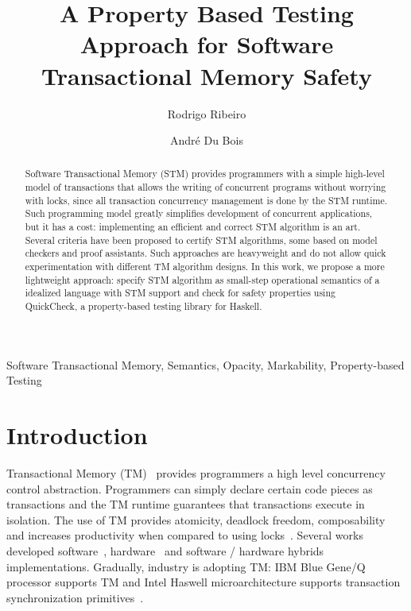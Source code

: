\documentclass[3p,times,procedia]{elsarticle}
\theoremstyle{definition}
\begin{document}
\begin{frontmatter}

\title{A Property Based Testing Approach for Software Transactional Memory Safety}


\author[rgr]{Rodrigo Ribeiro}

\author[ardb]{Andr\'e Du Bois}


\address[rgr]{Departament of Computing --- Universidade Federal de Ouro Preto, Ouro Preto, Brazil}
\address[ardb]{Departament of Computing --- Universidade Federal de Pelotas, Pelotas, Brazil}





\begin{abstract}
Software Transactional Memory (STM) provides programmers with a simple high-level model of transactions that allows the
writing of concurrent programs without worrying with locks, since all transaction concurrency management is done by
the STM runtime. Such programming model greatly simplifies development of concurrent applications, but it has a cost:
implementing an efficient and correct STM algorithm is an art. Several criteria have been proposed to certify
STM algorithms, some based on model checkers and proof assistants. Such approaches are heavyweight and
do not allow quick experimentation with different TM algorithm designs. In this work, we propose a more
lightweight approach: specify STM algorithm as small-step operational semantics of a idealized language with
STM support and check for safety properties using QuickCheck, a property-based testing library for Haskell.
\end{abstract}

\begin{keyword}
   Software Transactional Memory, Semantics, Opacity, Markability, Property-based Testing
\end{keyword}

\end{frontmatter}



\section{Introduction}

Transactional Memory (TM)~\cite{Herlihy1993,Shavit1995} provides programmers a high level concurrency
control abstraction. Programmers can simply declare certain code pieces as
transactions and the TM runtime guarantees that transactions execute in isolation.
The use of TM provides atomicity, deadlock freedom, composability~\cite{Harris05} and
increases productivity when compared to using locks~\cite{Pankratius2011}. Several works developed
software~\cite{Herlihy2003,Herlihy2006,Dice06}, hardware~\cite{Hammond2004} and software / hardware hybrids~\cite{Baugh2008,Dalessandro2011}
implementations. Gradually, industry is adopting TM: IBM Blue Gene/Q processor supports TM and Intel Haswell microarchitecture
supports transaction synchronization primitives~\cite{TSX,Haring2012}.
\end{document}
